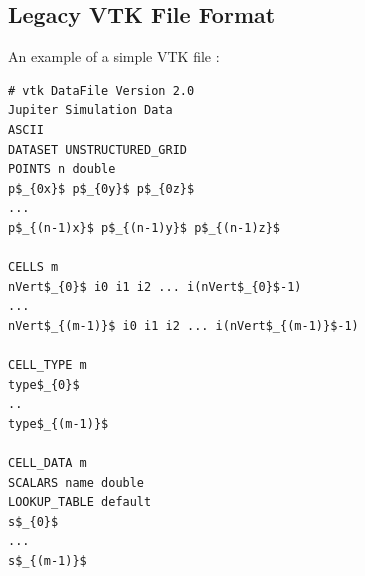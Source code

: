 \documentclass[twocolumn]{aastex62}
\newcommand\aastex{AAS\TeX}
\begin{document}





\begin{appendix}
\section{Legacy VTK File Format}
An example of a simple VTK file \cite{Formats2009}:
\begin{lstlisting}
# vtk DataFile Version 2.0
Jupiter Simulation Data
ASCII
DATASET UNSTRUCTURED_GRID
POINTS n double
p$_{0x}$ p$_{0y}$ p$_{0z}$
...
p$_{(n-1)x}$ p$_{(n-1)y}$ p$_{(n-1)z}$

CELLS m 
nVert$_{0}$ i0 i1 i2 ... i(nVert$_{0}$-1)
...
nVert$_{(m-1)}$ i0 i1 i2 ... i(nVert$_{(m-1)}$-1)

CELL_TYPE m 
type$_{0}$
..
type$_{(m-1)}$

CELL_DATA m
SCALARS name double
LOOKUP_TABLE default
s$_{0}$
...
s$_{(m-1)}$
\end{lstlisting}
\end{appendix}

\end{document}
